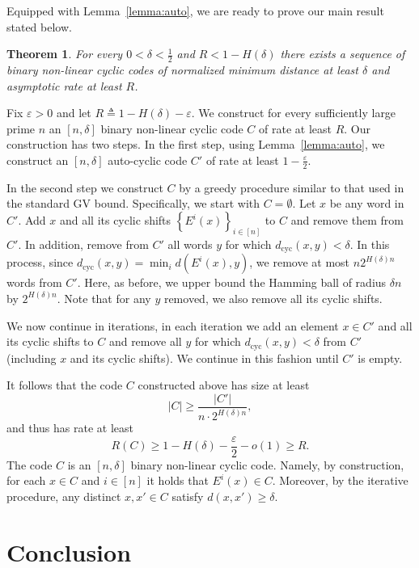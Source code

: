 \documentclass[twocolumn,twoside]{IEEEtran}
\theoremstyle{plain}
\newtheorem{thm}{Theorem$\!$}
\newenvironment{theorem}
{\begin{thm}\hspace*{-1ex}{\bf.}}{\end{thm}}
\newcommand{\e}{\varepsilon}
\newcommand{\mathset}[1]{\left\{#1\right\}}
\newcommand{\abs}[1]{\left|#1\right|}
\renewcommand{\geq}{\geqslant}
\newcommand{\eqdef}{\triangleq}
\newcommand{\dc}{d_{\mathrm{cyc}}}
\begin{document}
Equipped with Lemma~\ref{lemma:auto}, we are ready to prove our main
result stated below.

\begin{theorem}
For every $0 < \delta < \frac{1}{2}$ and $R<1-H(\delta)$ there exists a sequence of
binary non-linear cyclic codes of normalized minimum distance at least $\delta$ and 
asymptotic rate at least $R$.
\end{theorem}

\begin{IEEEproof}
Fix $\e >0$ and let $R\eqdef 1-H(\delta) -\e$.  We construct for every sufficiently large prime $n$ an $[n,\delta]$ binary non-linear cyclic code
$C$ of rate at least $R$.  Our construction has two steps.  In the first
step, using Lemma~\ref{lemma:auto}, we construct an $[n,\delta]$
auto-cyclic code $C'$ of rate at least $1-\frac{\e}{2}$.

In the second step we construct $C$ by a greedy procedure similar to
that used in the standard GV bound.  Specifically, we start with
$C=\emptyset$.  Let $x$ be any word in $C'$.  Add $x$ and all its
cyclic shifts $\mathset{E^i(x)}_{i \in [n]}$ to $C$ and remove them
from $C'$.  In addition, remove from $C'$ all words $y$ for which
$\dc(x,y) < \delta $.  In this process, since $\dc(x,y)=\min_i
d(E^i(x),y)$, we remove at most $n2^{H(\delta) n}$ words from $C'$.
Here, as before, we upper bound the Hamming ball of radius $\delta n$
by $2^{H(\delta) n}$.  Note that for any $y$ removed, we also remove
all its cyclic shifts.

We now continue in iterations, in each iteration we add an element $x
\in C'$ and all its cyclic shifts to $C$ and remove all $y$ for which
$\dc(x,y) < \delta $ from $C'$ (including $x$ and its cyclic shifts).
We continue in this fashion until $C'$ is empty.

It follows that the code $C$ constructed above
has size at least
\[\abs{C}\geq \frac{\abs{C'}}{n\cdot 2^{H(\delta) n}},\]
and thus has rate at least
\[R(C)\geq 1-H(\delta) -\frac{\e}{2}-o(1) \geq R.\]
The code $C$ is an $[n,\delta]$ binary non-linear cyclic code.
Namely, by construction, for each $x \in C$ and $i \in [n]$ it holds
that $E^i(x) \in C$.  Moreover, by the iterative procedure, any
distinct $x, x' \in C$ satisfy $d(x,x') \geq \delta$.
\end{IEEEproof}

\section{Conclusion}
\label{sec:conc}
\end{document}
